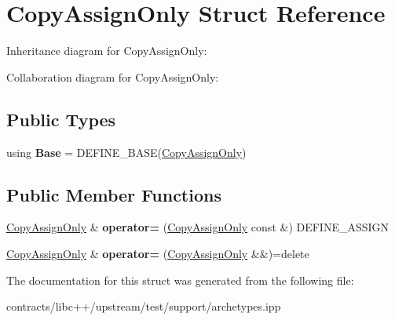 \hypertarget{struct_copy_assign_only}{}\section{Copy\+Assign\+Only Struct Reference}
\label{struct_copy_assign_only}


Inheritance diagram for Copy\+Assign\+Only\+:


Collaboration diagram for Copy\+Assign\+Only\+:
\subsection*{Public Types}
\begin{DoxyCompactItemize}
\item 
\mbox{\label{struct_copy_assign_only_aebd88123b49d977b277ec46494315e6d}} 
using {\bfseries Base} = D\+E\+F\+I\+N\+E\+\_\+\+B\+A\+SE(\mbox{\hyperlink{struct_copy_assign_only}{Copy\+Assign\+Only}})
\end{DoxyCompactItemize}
\subsection*{Public Member Functions}
\begin{DoxyCompactItemize}
\item 
\mbox{\label{struct_copy_assign_only_a29d5250a529929e59de253c27026a919}} 
\mbox{\hyperlink{struct_copy_assign_only}{Copy\+Assign\+Only}} \& {\bfseries operator=} (\mbox{\hyperlink{struct_copy_assign_only}{Copy\+Assign\+Only}} const \&) D\+E\+F\+I\+N\+E\+\_\+\+A\+S\+S\+I\+GN
\item 
\mbox{\label{struct_copy_assign_only_a3193c353beca67eaad0ccd3933949718}} 
\mbox{\hyperlink{struct_copy_assign_only}{Copy\+Assign\+Only}} \& {\bfseries operator=} (\mbox{\hyperlink{struct_copy_assign_only}{Copy\+Assign\+Only}} \&\&)=delete
\end{DoxyCompactItemize}


The documentation for this struct was generated from the following file\+:\begin{DoxyCompactItemize}
\item 
contracts/libc++/upstream/test/support/archetypes.\+ipp\end{DoxyCompactItemize}
